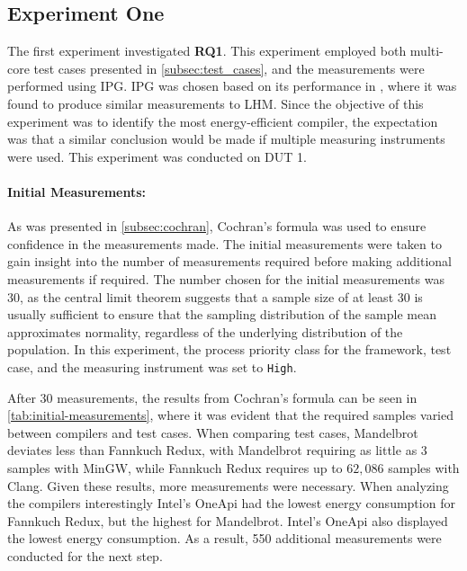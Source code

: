 \subsection{Experiment One}\label{subsec:exp_one}

The first experiment investigated \textbf{RQ1}. This experiment employed both multi-core test cases presented in \cref{subsec:test_cases}, and the measurements were performed using IPG. IPG was chosen based on its performance in \cite{biksbois}, where it was found to produce similar measurements to LHM. Since the objective of this experiment was to identify the most energy-efficient compiler, the expectation was that a similar conclusion would be made if multiple measuring instruments were used. This experiment was conducted on DUT 1.  

\paragraph{Initial Measurements:} As was presented in \cref{subsec:cochran}, Cochran's formula was used to ensure confidence in the measurements made. The initial measurements were taken to gain insight into the number of measurements required before making additional measurements if required. The number chosen for the initial measurements was 30, as the central limit theorem suggests that a sample size of at least 30 is usually sufficient to ensure that the sampling distribution of the sample mean approximates normality, regardless of the underlying distribution of the population\cite{central-limit-theorem}. In this experiment, the process priority class for the framework, test case, and the measuring instrument was set to \texttt{High}.



After 30 measurements, the results from Cochran's formula can be seen in \cref{tab:initial-measurements}, where it was evident that the required samples varied between compilers and test cases. When comparing test cases, Mandelbrot deviates less than Fannkuch Redux, with Mandelbrot requiring as little as $3$ samples with MinGW, while Fannkuch Redux requires up to $62,086$ samples with Clang. Given these results, more measurements were necessary. When analyzing the compilers interestingly Intel's OneApi had the lowest energy consumption for Fannkuch Redux, but the highest for Mandelbrot. Intel's OneApi also displayed the lowest energy consumption. As a result, 550 additional measurements were conducted for the next step.

